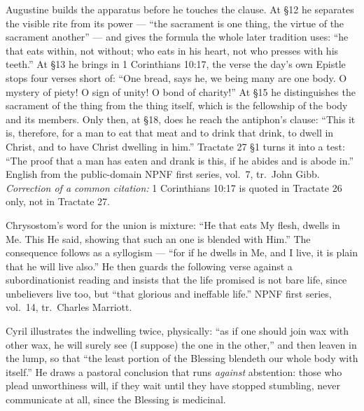 \begin{witnessnote}
Augustine builds the apparatus before he touches the clause. At §12 he
separates the visible rite from its power --- ``the sacrament is one thing, the
virtue of the sacrament another'' --- and gives the formula the whole later
tradition uses: ``he that eats within, not without; who eats in his heart, not
who presses with his teeth.'' At §13 he brings in 1 Corinthians 10:17, the
verse the day's own Epistle stops four verses short of: ``One bread, says he,
we being many are one body. O mystery of piety! O sign of unity! O bond of
charity!'' At §15 he distinguishes the sacrament of the thing from the thing
itself, which is the fellowship of the body and its members. Only then, at
§18, does he reach the antiphon's clause: ``This it is, therefore, for a man to
eat that meat and to drink that drink, to dwell in Christ, and to have Christ
dwelling in him.'' Tractate 27 §1 turns it into a test: ``The proof that a man
has eaten and drank is this, if he abides and is abode in.'' English from the
public-domain NPNF first series, vol.~7, tr.\ John Gibb. \textit{Correction of
a common citation:} 1 Corinthians 10:17 is quoted in Tractate 26 only, not in
Tractate 27.
\end{witnessnote}

\begin{witnessnote}
Chrysostom's word for the union is mixture: ``He that eats My flesh, dwells in
Me. This He said, showing that such an one is blended with Him.'' The
consequence follows as a syllogism --- ``for if he dwells in Me, and I live, it
is plain that he will live also.'' He then guards the following verse against
a subordinationist reading and insists that the life promised is not bare life,
since unbelievers live too, but ``that glorious and ineffable life.'' NPNF
first series, vol.~14, tr.\ Charles Marriott.
\end{witnessnote}

\begin{witnessnote}
Cyril illustrates the indwelling twice, physically: ``as if one should join wax
with other wax, he will surely see (I suppose) the one in the other,'' and
then leaven in the lump, so that ``the least portion of the Blessing blendeth
our whole body with itself.'' He draws a pastoral conclusion that runs
\textit{against} abstention: those who plead unworthiness will, if they wait
until they have stopped stumbling, never communicate at all, since the
Blessing is medicinal.
\end{witnessnote}

